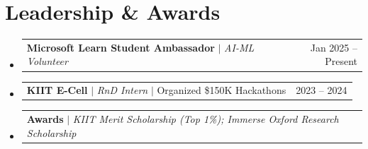 \documentclass[letterpaper,11pt]{article}
\makeatletter
\newcommand{\resumeProjectHeading}[2]{
    \item
    \begin{tabular*}{0.97\textwidth}{l@{\extracolsep{\fill}}r}
      \small#1 & #2 \\
    \end{tabular*}
}
\newcommand{\resumeSubHeadingListStart}{\begin{itemize}[leftmargin=0.15in, label={}]}
\newcommand{\resumeSubHeadingListEnd}{\end{itemize}\vspace{-5pt}}
\makeatother
\begin{document}
\vspace{-12pt}
\section{Leadership \& Awards}
  \resumeSubHeadingListStart
    \resumeProjectHeading{\textbf{Microsoft Learn Student Ambassador} $|$ \emph{AI-ML Volunteer}}{Jan 2025 -- Present}
    \resumeProjectHeading{\textbf{KIIT E-Cell} $|$ \emph{RnD Intern} $|$ Organized \$150K Hackathons}{2023 -- 2024}
    \resumeProjectHeading{\textbf{Awards} $|$ \emph{KIIT Merit Scholarship (Top 1\%); Immerse Oxford Research Scholarship}}{}
  \resumeSubHeadingListEnd

\enlargethispage{4\baselineskip}
\end{document}
